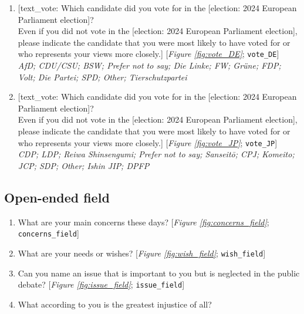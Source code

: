 \begin{enumerate}[resume]
\item  \label{q:vote_DE} [text\_vote: Which candidate did you vote for in the [election: 2024 European Parliament election]?\\Even if you did not vote in the [election: 2024 European Parliament election], please indicate the candidate that you were most likely to have voted for or who represents your views more closely.] [\textit{Figure \ref{fig:vote_DE}}; 
\verb|vote_DE|]
  \\ \textit{AfD; CDU/CSU; BSW; Prefer not to say; Die Linke; FW; Grüne; FDP; Volt; Die Partei; SPD; Other; Tierschutzpartei}

\item  \label{q:vote_JP} [text\_vote: Which candidate did you vote for in the [election: 2024 European Parliament election]?\\Even if you did not vote in the [election: 2024 European Parliament election], please indicate the candidate that you were most likely to have voted for or who represents your views more closely.] [\textit{Figure \ref{fig:vote_JP}}; 
\verb|vote_JP|]
  \\ \textit{CDP; LDP; Reiwa Shinsengumi; Prefer not to say; Sanseitō; CPJ; Komeito; JCP; SDP; Other; Ishin JIP; DPFP}

\end{enumerate} 

 \subsection*{Open-ended field} 
 \begin{enumerate}[resume] 
\item  \label{q:concerns_field} What are your main concerns these days? [\textit{Figure \ref{fig:concerns_field}}; 
\verb|concerns_field|]


\item  \label{q:wish_field} What are your needs or wishes? [\textit{Figure \ref{fig:wish_field}}; 
\verb|wish_field|]


\item  \label{q:issue_field} Can you name an issue that is important to you but is neglected in the public debate? [\textit{Figure \ref{fig:issue_field}}; 
\verb|issue_field|]


\item  \label{q:injustice_field} What according to you is the greatest injustice of all?\\ [\textit{Figure \ref{fig:injustice_field}}; 
\verb|injustice_field|]


\end{enumerate} 

